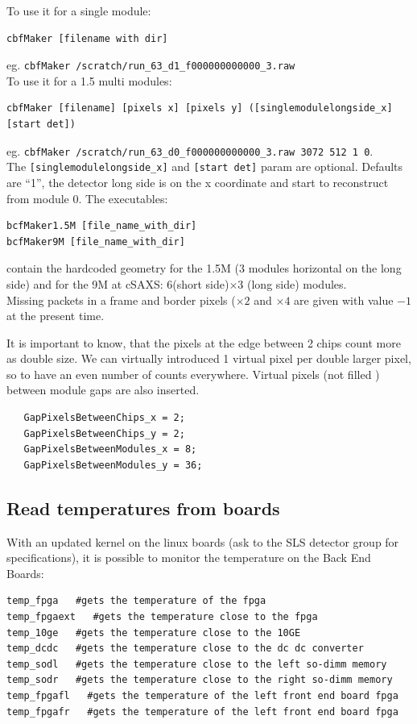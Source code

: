\documentclass{article}
\begin{document}
To use it for a single module:
\begin{verbatim}
cbfMaker [filename with dir]
\end{verbatim}
eg.
{\tt{cbfMaker /scratch/run\_63\_d1\_f000000000000\_3.raw}}\\

To use it for a 1.5 multi modules:
\begin{verbatim}
cbfMaker [filename] [pixels x] [pixels y] ([singlemodulelongside_x] [start det])
\end{verbatim}
eg.
{\tt cbfMaker /scratch/run\_63\_d0\_f000000000000\_3.raw  3072 512 1 0}.\\
The {\tt{[singlemodulelongside\_x]}} and {\tt{[start det]}} param are optional. Defaults are ``1'', the detector long side is on the x coordinate and start to reconstruct from module 0. 
The executables: 
\begin{verbatim}
bcfMaker1.5M [file_name_with_dir]
bcfMaker9M [file_name_with_dir]
\end{verbatim}
contain the hardcoded geometry for the 1.5M (3 modules horizontal on the long side) and for the 9M at cSAXS: 6(short side)$\times$3 (long side) modules.\\ 
Missing packets in a frame and border pixels ($\times 2$ and $\times 4$ are given with value $-1$ at the present time.

It is important to know, that the pixels at the edge between 2 chips count more as double size. We can virtually introduced 1 virtual pixel per double larger pixel, so to have an even number of counts everywhere. Virtual pixels (not filled ) between module gaps are also inserted.

 \begin{verbatim}
   GapPixelsBetweenChips_x = 2;
   GapPixelsBetweenChips_y = 2;
   GapPixelsBetweenModules_x = 8;
   GapPixelsBetweenModules_y = 36;
 \end{verbatim}

\subsection{Read temperatures from boards}

With an updated kernel on the linux boards (ask to the SLS detector group for specifications), it is possible to monitor the temperature on the Back End Boards: 
\begin{verbatim}
temp_fpga   #gets the temperature of the fpga
temp_fpgaext   #gets the temperature close to the fpga
temp_10ge   #gets the temperature close to the 10GE
temp_dcdc   #gets the temperature close to the dc dc converter
temp_sodl   #gets the temperature close to the left so-dimm memory
temp_sodr   #gets the temperature close to the right so-dimm memory
temp_fpgafl   #gets the temperature of the left front end board fpga
temp_fpgafr   #gets the temperature of the left front end board fpga

\end{verbatim}
\end{document}
